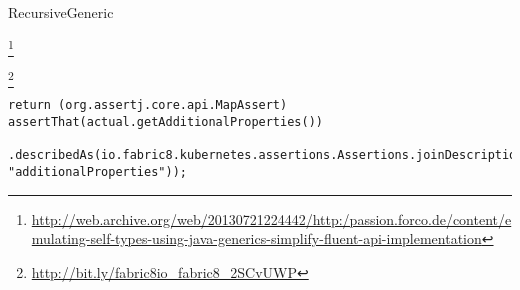 \begin{pattern}{RecursiveGeneric}


\footnote{\url{http://web.archive.org/web/20130721224442/http:/passion.forco.de/content/emulating-self-types-using-java-generics-simplify-fluent-api-implementation}}

\instances{}

\footnote{\url{http://bit.ly/fabric8io_fabric8_2SCvUWP}}

\begin{verbatim}
return (org.assertj.core.api.MapAssert) assertThat(actual.getAdditionalProperties())
    .describedAs(io.fabric8.kubernetes.assertions.Assertions.joinDescription(this, "additionalProperties"));
\end{verbatim}

\detection{}

\discussion{}

\related{}

\end{pattern}